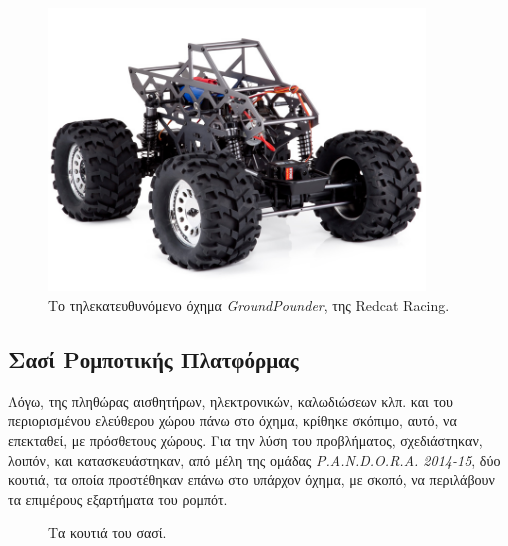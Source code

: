 \begin{figure}[!ht]
	\begin{center}
		\includegraphics[width=10cm]{Chapters/Chapter2/Figures/groundpounder.jpg}
		\caption{Το τηλεκατευθυνόμενο όχημα \textit{GroundPounder}, της Redcat Racing.}
		\label{fig:groundpounder}
	\end{center}
\end{figure}

\bigskip
\subsection{Σασί Ρομποτικής Πλατφόρμας}
Λόγω, της πληθώρας αισθητήρων, ηλεκτρονικών, καλωδιώσεων κλπ. και του περιορισμένου ελεύθερου χώρου πάνω στο όχημα, κρίθηκε σκόπιμο, αυτό, να επεκταθεί, με πρόσθετους χώρους. Για την λύση του προβλήματος, σχεδιάστηκαν, λοιπόν, και κατασκευάστηκαν, από μέλη της ομάδας \textit{P.A.N.D.O.R.A. 2014-15}, δύο κουτιά, τα οποία προστέθηκαν επάνω στο υπάρχον όχημα, με σκοπό, να περιλάβουν τα επιμέρους εξαρτήματα του ρομπότ.

\begin{figure}[!ht]
	\centering
	\caption{Τα κουτιά του σασί.}
\end{figure}

